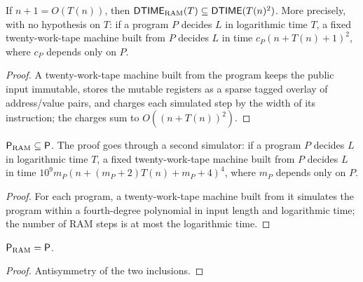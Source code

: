 \begin{theorem}
  \label{thm:models-ram-dtime-sq}
  \leanok
  If $n + 1 = O(T(n))$, then
  $\mathsf{DTIME}_{\mathrm{RAM}}(T) \subseteq \mathsf{DTIME}(T(n)^2)$. More
  precisely, with no hypothesis on $T$: if a program $P$ decides $L$ in
  logarithmic time $T$, a fixed twenty-work-tape machine built from $P$
  decides $L$ in time $c_P (n + T(n) + 1)^2$, where $c_P$ depends only on $P$.
\end{theorem}
\begin{proof}
  \leanok
  A twenty-work-tape machine built from the program keeps the public input
  immutable, stores the mutable registers as a sparse tagged overlay of
  address/value pairs, and charges each simulated step by the width of its
  instruction; the charges sum to $O((n + T(n))^2)$.
\end{proof}

\begin{theorem}
  \label{thm:models-ram-p-subset-p}
  \leanok
  $\mathsf{P}_{\mathrm{RAM}} \subseteq \mathsf{P}$. The proof goes through a second
  simulator: if a program $P$ decides $L$ in logarithmic time $T$, a fixed
  twenty-work-tape machine built from $P$ decides $L$ in time
  $10^9 m_P (n + (m_P + 2) T(n) + m_P + 4)^4$, where $m_P$ depends only on $P$.
\end{theorem}
\begin{proof}
  \leanok
  For each program, a twenty-work-tape machine built from it simulates the
  program within a fourth-degree polynomial in input length and logarithmic
  time; the number of RAM steps is at most the logarithmic time.
\end{proof}

\begin{theorem}
  \label{thm:models-ram-p-eq-p}
  \leanok
  $\mathsf{P}_{\mathrm{RAM}} = \mathsf{P}$.
\end{theorem}
\begin{proof}
  \leanok
  Antisymmetry of the two inclusions.
\end{proof}

